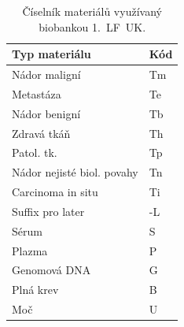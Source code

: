 \begin{appendix}
\begin{table}[ht] 
\centering
\begin{tabular}{l l}
\hline 
Typ materiálu & Kód \\
\hline \hline
Nádor maligní 							& Tm 	\\
Metastáza 									& Te 	\\
Nádor benigní 							& Tb 	\\
Zdravá tkáň 								& Th 	\\
Patol. tk. 									& Tp 	\\
Nádor nejisté biol. povahy 	& Tn 	\\
Carcinoma in situ 					& Ti 	\\
Suffix pro later 						& -L 	\\
Sérum 											& S~	\\
Plazma 											& P 	\\
Genomová DNA 								& G 	\\
Plná krev 									& B 	\\
Moč 												& U~	\\

\hline %
\end{tabular} 
\caption{Číselník materiálů využívaný biobankou 1.~LF~UK.}
\label{tab:ciselnik-mat-Ilfuk} %
\end{table} 

\end{appendix}


